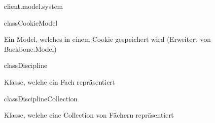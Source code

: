 \begin{texdocpackage}{client.model.system}
\label{texdoclet:edu.kit.informatik.studyplan.client.model.system}

\begin{texdocclass}{class}{CookieModel}
\label{texdoclet:edu.kit.informatik.studyplan.client.model.system.CookieModel}
\begin{texdocclassintro}
Ein Model, welches in einem Cookie gespeichert wird (Erweitert von
 Backbone.Model)\end{texdocclassintro}
\begin{texdocclassfields}
\end{texdocclassfields}
\begin{texdocclassconstructors}
\end{texdocclassconstructors}
\end{texdocclass}


\begin{texdocclass}{class}{Discipline}
\label{texdoclet:edu.kit.informatik.studyplan.client.model.system.Discipline}
\begin{texdocclassintro}
Klasse, welche ein Fach repräsentiert\end{texdocclassintro}
\begin{texdocclassfields}
\end{texdocclassfields}
\begin{texdocclassconstructors}
\end{texdocclassconstructors}
\end{texdocclass}


\begin{texdocclass}{class}{DisciplineCollection}
\label{texdoclet:edu.kit.informatik.studyplan.client.model.system.DisciplineCollection}
\begin{texdocclassintro}
Klasse, welche eine Collection von Fächern repräsentiert\end{texdocclassintro}
\begin{texdocclassfields}
\end{texdocclassfields}
\begin{texdocclassconstructors}
\end{texdocclassconstructors}
\end{texdocclass}



\end{texdocpackage}
